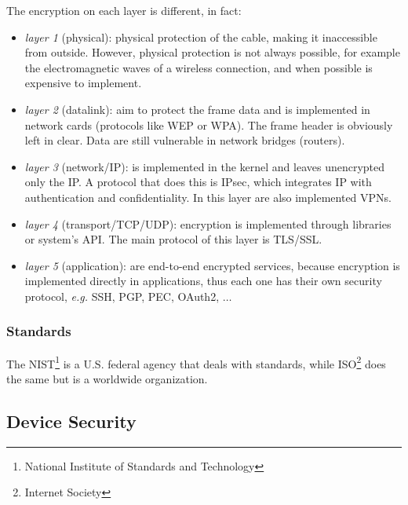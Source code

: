 \documentclass[oneside]{academica}
\begin{document}
The encryption on each layer is different, in fact:
\begin{itemize}
  \item \textit{layer 1} (physical): physical protection of the cable, making it inaccessible from outside.
    However, physical protection is not always possible, for example the electromagnetic waves of a wireless connection, and when possible is expensive to implement.
  \item \textit{layer 2} (datalink): aim to protect the frame data and is implemented in network cards (protocols like WEP or WPA). The frame header is obviously left in clear. Data are still vulnerable in network bridges (routers).
  \item \textit{layer 3} (network/IP): is implemented in the kernel and leaves unencrypted only the IP. A protocol that does this is IPsec, which integrates IP with authentication and confidentiality. In this layer are also implemented VPNs.
  \item \textit{layer 4} (transport/TCP/UDP): encryption is implemented through libraries or system's API. The main protocol of this layer is TLS/SSL.
  \item \textit{layer 5} (application): are end-to-end encrypted services, because encryption is implemented directly in applications, thus each one has their own security protocol, \textit{e.g.} SSH, PGP, PEC, OAuth2, $\ldots$
\end{itemize}

\subsubsection{Standards}

The NIST\footnote{National Institute of Standards and Technology} is a U.S. federal agency that deals with standards, while ISO\footnote{Internet Society} does the same but is a worldwide organization.

\subsection{Device Security}
\end{document}
